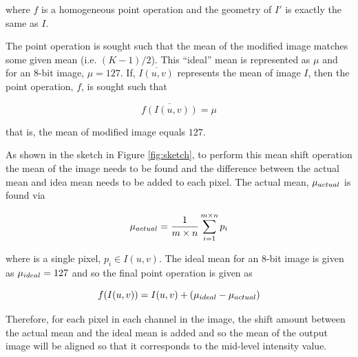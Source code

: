 \documentclass[journal,transmag]{IEEEtran}
\begin{document}

\noindent where $f$ is a homogeneous point operation and the geometry of $I'$ is exactly the same as $I$.

The point operation is sought such that the mean of the modified image matches some given mean (i.e. $(K-1)/2$).  This ``ideal'' mean is represented as $\mu$ and for an $8$-bit image, $\mu = 127$.  If, $\overline{I(u, v)}$ represents the mean of image $I$, then the point operation, $f$, is sought such that

\begin{equation}
	\overline{f(I(u, v))} = \mu
\end{equation}

\noindent that is, the mean of modified image equals $127$.

As shown in the sketch in Figure \ref{fig:sketch}, to perform this mean shift operation the mean of the image needs to be found and the difference between the actual mean and idea mean needs to be added to each pixel.  The actual mean, $\mu_{\mbox{\tiny{actual}}}$ is found via

\begin{equation}
	\mu_{\mbox{\tiny{actual}}} = \frac{1}{m \times n}\sum_{i=1}^{m \times n} p_{i}
\end{equation}

\noindent where is a single pixel, $p_{i} \in I(u, v)$.  The ideal mean for an $8$-bit image is given as $\mu_{\mbox{\tiny{ideal}}} = 127$ and so the final point operation is given as

\begin{equation}
	f(I(u, v)) = I(u, v) + (\mu_{\mbox{\tiny{ideal}}} - \mu_{\mbox{\tiny{actual}}})
\end{equation}

Therefore, for each pixel in each channel in the image, the shift amount between the actual mean and the ideal mean is added and so the mean of the output image will be aligned so that it corresponds to the mid-level intensity value.
\end{document}
